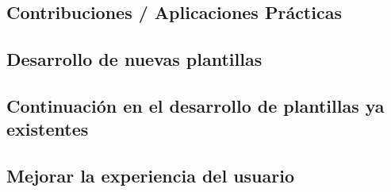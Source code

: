 \documentclass[12pt, a4paper, twoside]{article}
\begin{document}
\subsection{Contribuciones / Aplicaciones Prácticas}
\subsection{Desarrollo de nuevas plantillas }
\subsection{Continuación en el desarrollo de plantillas ya existentes}
\subsection{Mejorar la experiencia del usuario }














\printbibliography




\end{document}
